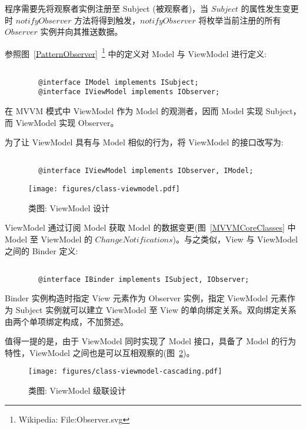 程序需要先将观察者实例注册至 Subject (被观察者)，当 $Subject$ 的属性发生变更时 $notifyObserver$ 方法将得到触发，$notifyObserver$ 将枚举当前注册的所有 $Observer$ 实例并向其推送数据。

参照图~\ref{PatternObserver}~\footnote{Wikipedia: File:Observer.svg} 中的定义对 Model 与 ViewModel 进行定义:

\begin{verbatim}

        @interface IModel implements ISubject;
        @interface IViewModel implements IObserver;

\end{verbatim}

在 MVVM 模式中 ViewModel 作为 Model 的观测者，因而 Model 实现 Subject，而 ViewModel 实现 Observer。

为了让 ViewModel 具有与 Model 相似的行为，将 ViewModel 的接口改写为:

\begin{verbatim}

        @interface IViewModel implements IObserver, IModel;

\end{verbatim}

\begin{figure}[!h]
  \begin{center}
    \texttt{[image: figures/class-viewmodel.pdf]}
    \caption{类图: ViewModel 设计\label{ViewModelClass}}
  \end{center}
\end{figure}

ViewModel 通过订阅 Model 获取 Model 的数据变更(图~\ref{MVVMCoreClasses} 中 Model 至 ViewModel 的 $Change Notifications$)。与之类似，View 与 ViewModel 之间的 Binder 定义:

\begin{verbatim}

        @interface IBinder implements ISubject, IObserver;

\end{verbatim}

Binder 实例构造时指定 View 元素作为 Observer 实例，指定 ViewModel 元素作为 Subject 实例就可以建立 ViewModel 至 View 的单向绑定关系。双向绑定关系由两个单项绑定构成，不加赘述。

值得一提的是，由于 ViewModel 同时实现了 Model 接口，具备了 Model 的行为特性，ViewModel 之间也是可以互相观察的(图~\ref{ViewModelCascading})。

\begin{figure}[!h]
  \begin{center}
    \texttt{[image: figures/class-viewmodel-cascading.pdf]}
    \caption{类图: ViewModel 级联设计\label{ViewModelCascading}}
  \end{center}
\end{figure}

